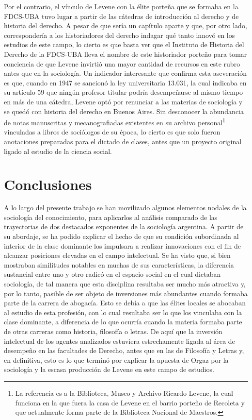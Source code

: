Por el contrario, el vínculo de Levene con la élite porteña que se formaba en la FDCS-UBA tuvo lugar a partir de las cátedras de introducción al derecho y de historia del derecho. A pesar de que sería un capítulo aparte y que, por otro lado, correspondería a los historiadores del derecho indagar qué tanto innovó en los estudios de este campo, lo cierto es que basta ver que el Instituto de Historia del Derecho de la FDCS-UBA lleva el nombre de este historiador porteño para tomar conciencia de que Levene invirtió una mayor cantidad de recursos en este rubro antes que en la sociología. Un indicador interesante que confirma esta aseveración es que, cuando en 1947 se sancionó la ley universitaria 13.031, la cual indicaba en su artículo 59 que ningún profesor titular podría desempeñarse al mismo tiempo en más de una cátedra, Levene optó por renunciar a las materias de sociología y se quedó con historia del derecho en Buenos Aires. Sin desconocer la abundancia de notas manuscritas y mecanografiadas existentes en su archivo personal\footnote{La referencia es a la Biblioteca, Museo y Archivo Ricardo Levene, la cual funciona en la que fuera la casa de Levene en el barrio porteño de Recoleta y que actualmente forma parte de la Biblioteca Nacional de Maestros.} vinculadas a libros de sociólogos de su época, lo cierto es que solo fueron anotaciones preparadas para el dictado de clases, antes que un proyecto original ligado al estudio de la ciencia social.

\section{Conclusiones}

A lo largo del presente trabajo se han movilizado algunos elementos nodales de la sociología del conocimiento, para aplicarlos al análisis comparado de las trayectorias de dos destacados exponentes de la sociología argentina. A partir de su abordaje, se ha podido explicar el hecho de que su condición subordinada al interior de la clase dominante los impulsara a realizar innovaciones con el fin de alcanzar posiciones elevadas en el campo intelectual. Se ha visto que, si bien mostraban similitudes notables en muchas de sus características, la diferencia sustancial entre uno y otro radicó en el espacio social en el cual dictaban sociología, de tal manera que esta disciplina resultaba ser mucho más atractiva y, por lo tanto, pasible de ser objeto de inversiones más abundantes cuando formaba parte de la carrera de abogacía. Esto se debía a que las élites locales se abocaban al estudio de esta profesión, con lo cual resultaba ser lo que los vinculaba con la clase dominante, a diferencia de lo que ocurría cuando la materia formaba parte de otras carreras como historia, filosofía o letras. De aquí que la inversión intelectual de los agentes analizados estuviera estrechamente ligada al área de desempeño en las facultades de Derecho, antes que en las de Filosofía y Letras y, en definitiva, esto es lo que terminó por explicar la apuesta de Orgaz por la sociología y la escasa producción de Levene en este campo de estudios.

